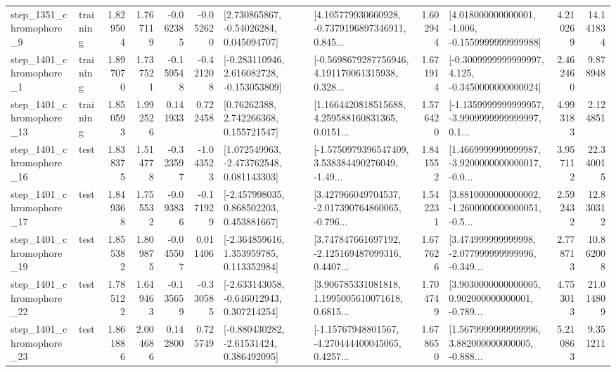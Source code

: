 \begin{tabular}{llrrrrllrlrr}
  step\_1351\_chromophore\_9 &  training &      1.829504 &    1.767119 &     -0.062385 & -0.052620 &     [2.730865867, -0.54026284, 0.045094707] &  [4.105779930660928, -0.7379196897346911, 0.845... &       1.602944 &   [4.018000000000001, -1.006, -0.1559999999999988] &            4.210269 &         14.141834 \\
  step\_1401\_chromophore\_1 &  training &      1.897070 &    1.737521 &     -0.159548 & -0.421208 &   [-0.283110946, 2.616082728, -0.153053809] &  [-0.5698679287756946, 4.191170061315938, 0.328... &       1.671914 &  [-0.3009999999999997, 4.125, -0.3450000000000024] &            2.462460 &          9.878948 \\
 step\_1401\_chromophore\_13 &  training &      1.850593 &    1.992526 &      0.141933 &  0.722458 &      [0.76262388, 2.742266368, 0.155721547] &  [1.1664420818515688, 4.259588160831365, 0.0151... &       1.576420 &  [-1.1359999999999957, -3.9909999999999997, 0.1... &            4.993183 &          2.124851 \\
 step\_1401\_chromophore\_16 &      test &      1.838375 &    1.514778 &     -0.323597 & -1.043523 &    [1.072549963, -2.473762548, 0.081143303] &  [-1.5750979396547409, 3.538384490276049, -1.49... &       1.841552 &  [1.4669999999999987, -3.9200000000000017, -0.0... &            3.957112 &         22.340015 \\
 step\_1401\_chromophore\_17 &      test &      1.849368 &    1.755532 &     -0.093836 & -0.171929 &    [-2.457998035, 0.868502203, 0.453881667] &  [3.427966049704537, -2.017390764860065, -0.796... &       1.542231 &  [3.8810000000000002, -1.2600000000000051, -0.5... &            2.592432 &         12.830312 \\
 step\_1401\_chromophore\_19 &      test &      1.855382 &    1.809875 &     -0.045507 &  0.011406 &    [-2.364859616, 1.353959785, 0.113352984] &  [3.747847661697192, -2.125169487099316, 0.4407... &       1.677626 &  [3.474999999999998, -2.077999999999996, -0.349... &            2.778713 &         10.862008 \\
 step\_1401\_chromophore\_22 &      test &      1.785122 &    1.649463 &     -0.135659 & -0.330585 &   [-2.633143058, -0.646012943, 0.307214254] &  [3.906785331081818, 1.1995005610071618, 0.6815... &       1.704749 &  [3.9030000000000005, 0.902000000000001, -0.789... &            4.753013 &         21.014809 \\
 step\_1401\_chromophore\_23 &      test &      1.861886 &    2.004686 &      0.142800 &  0.725749 &    [-0.880430282, -2.61531424, 0.386492095] &  [-1.15767948801567, -4.270444400045065, 0.4257... &       1.678650 &  [1.5679999999999996, 3.882000000000005, -0.888... &            5.210863 &          9.351211 \\

\end{tabular}
